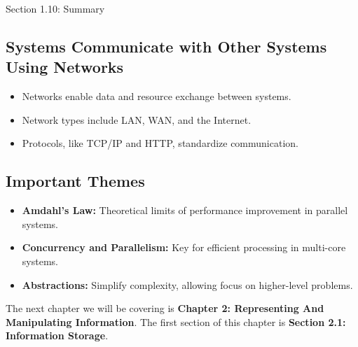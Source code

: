\begin{notes}{Section 1.10: Summary}
    \subsection*{Systems Communicate with Other Systems Using Networks}
    
    \begin{itemize}
        \item Networks enable data and resource exchange between systems.
        \item Network types include LAN, WAN, and the Internet.
        \item Protocols, like TCP/IP and HTTP, standardize communication.
    \end{itemize}
    
    \subsection*{Important Themes}
    
    \begin{itemize}
        \item \textbf{Amdahl's Law:} Theoretical limits of performance improvement in parallel systems.
        \item \textbf{Concurrency and Parallelism:} Key for efficient processing in multi-core systems.
        \item \textbf{Abstractions:} Simplify complexity, allowing focus on higher-level problems.
    \end{itemize}    
\end{notes}

The next chapter we will be covering is \textbf{Chapter 2: Representing And Manipulating Information}. The first section of this chapter is \textbf{Section 2.1: Information Storage}.

